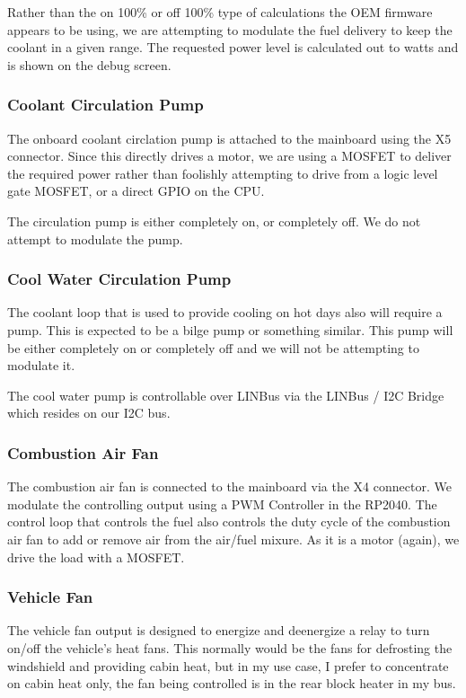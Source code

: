 \documentclass[lettersize,journal]{IEEEtran}
\begin{document}
Rather than the on 100\% or off 100\% type of calculations the OEM firmware appears to be using, we are attempting to modulate the fuel delivery to keep the coolant in a given range.  The requested power level is calculated out to watts and is shown on the debug screen. 

\subsubsection{Coolant Circulation Pump}
The onboard coolant circlation pump is attached to the mainboard using the X5 connector.  Since this directly drives a motor, we are using a MOSFET to deliver the required power rather than foolishly attempting to drive from a logic level gate MOSFET, or a direct GPIO on the CPU.

The circulation pump is either completely on, or completely off.  We do not attempt to modulate the pump.

\subsubsection{Cool Water Circulation Pump}
The coolant loop that is used to provide cooling on hot days also will require a pump.  This is expected to be a bilge pump or something similar.  This pump will be either completely on or completely off and we will not be attempting to modulate it.

The cool water pump is controllable over LINBus via the LINBus / I2C Bridge which resides on our I2C bus.

\subsubsection{Combustion Air Fan}
The combustion air fan is connected to the mainboard via the X4 connector.  We modulate the controlling output using a PWM Controller in the RP2040.  The control loop that controls the fuel also controls the duty cycle of the combustion air fan to add or remove air from the air/fuel mixure.  As it is a motor (again), we drive the load with a MOSFET.

\subsubsection{Vehicle Fan}
The vehicle fan output is designed to energize and deenergize a relay to turn on/off the vehicle's heat fans.  This normally would be the fans for defrosting the windshield and providing cabin heat, but in my use case, I prefer to concentrate on cabin heat only, the fan being controlled is in the rear block heater in my bus.
\end{document}
